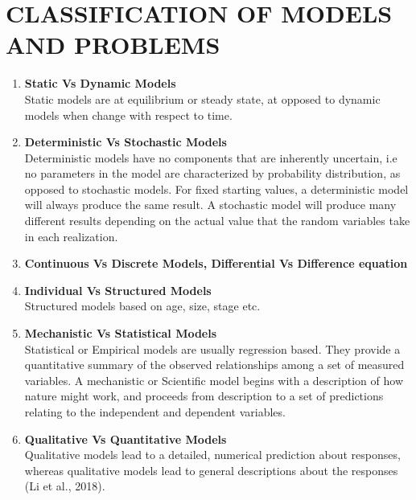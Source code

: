 \documentclass[12pt]{report}
\newcommand{\bt}[1]{\textbf{#1}}
\newcommand{\spn}[1]{\\[#1cm]}
\begin{document}
	\section{CLASSIFICATION OF MODELS AND PROBLEMS}
	\begin{enumerate}
		\item \bt{Static Vs Dynamic Models}\\
		Static models are at equilibrium or steady state, at opposed to dynamic models when change with respect to time.\spn{0.4}
		
		\item \bt{Deterministic Vs Stochastic Models}\\
		Deterministic models have no components that are inherently uncertain, i.e no parameters in the model  are characterized by probability distribution, as opposed to stochastic models. For fixed starting values, a deterministic model will always produce the same result. A stochastic model will produce many different results depending on the actual value that the random variables take in each realization.
		
		\item \bt{Continuous Vs Discrete Models, Differential Vs Difference equation}
		
		\item \bt{Individual Vs Structured Models}\\
		Structured models based on age, size, stage etc.
		
		\item \bt{Mechanistic Vs Statistical Models}\\
		Statistical or Empirical models are usually regression based. They provide a quantitative summary of the observed relationships among a set of measured variables. A mechanistic or Scientific model begins with a description of how nature might work, and proceeds from description to a set of predictions relating to the independent and dependent variables.
		
		\item \bt{Qualitative Vs Quantitative Models}\\
		Qualitative models lead to a detailed, numerical prediction about responses, whereas qualitative models lead to general descriptions about the responses (Li et al., 2018).
	\end{enumerate}
\end{document}
